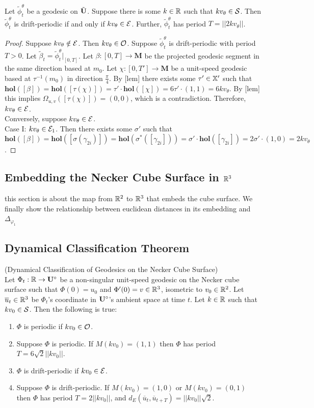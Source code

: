 \documentclass[]{article}
\def\hol{\mathbf{hol}}
\def\bM{\mathbf{M}}
\def\tildphi{\tilde{\phi}}
\begin{document}
\begin{thm}
Let $\tildphi_t^\theta$ be a geodesic on $\tilde{\mathbf{U}}$. Suppose there is some $k\in\mathbb{R}$ such that $kv_\theta\in\mathcal{S}$. Then $\tildphi_t^\theta$ is drift-periodic if and only if $kv_\theta\in\mathcal{E}$. Further, $\tildphi_t^\theta$ has period $T=||2kv_\theta||$.
\begin{proof}
Suppose $kv_\theta\notin\mathcal{E}$. Then $kv_\theta\in\mathcal{O}$. Suppose $\tildphi_t^\theta$ is drift-periodic with period $T>0$. Let $\tilde{\beta}_t=\tildphi_t^\theta\vert_{[0,T]}$. Let $\beta:[0,T]\rightarrow\bM$ be the projected geodesic segment in the same direction based at $m_0$. Let $\chi:[0,T']\rightarrow\bM$ be a unit-speed geodesic based at $\tau^{-1}(m_0)$ in direction $\frac{\pi}{4}$. By [lem] there exists some $\tau'\in\mathbb{X}'$ such that $\hol([\beta])=\hol([\tau(\chi)])=\tau'\cdot\hol([\chi])=6\tau'\cdot(1,1)=6kv_\theta$. By [lem] this implies $\Omega_{u,v}([\tau(\chi)])=(0,0)$, which is a contradiction. Therefore, $kv_\theta\in\mathcal{E}$.\\
Conversely, suppose $kv_\theta\in\mathcal{E}$.\\
Case I: $kv_\theta\in\mathcal{E}_1$. Then there exists some $\sigma'$ such that $\hol([\beta])=\hol([\sigma(\gamma_{2i})])=\hol(\sigma^*([\gamma_{2i}]))=\sigma'\cdot\hol([\gamma_{2i}])=2\sigma'\cdot(1,0)=2kv_\theta$.
\end{proof}
\end{thm}

\subsection{Embedding the Necker Cube Surface in $\mathbb{R}^3$}
this section is about the map from $\mathbb{R}^2$ to $\mathbb{R}^3$ that embeds the cube surface. We finally show the relationship between euclidean distances in its embedding and $\Delta_{\varphi_1}$

\subsection{Dynamical Classification Theorem}
\begin{thm*}
(Dynamical Classification of Geodesics on the Necker Cube Surface) \\Let $\Phi_t:\mathbb{R}\rightarrow\mathbf{U}^\circ$ be a non-singular unit-speed geodesic on the Necker cube surface such that $\Phi(0)=u_0$ and $\Phi'(0)=v\in\mathbb{R}^3$, isometric to $v_0\in\mathbb{R}^2$. Let $\overline{u}_t\in\mathbb{R}^3$ be $\Phi_t$'s coordinate in $\mathbf{U}^\circ$'s ambient space at time $t$. Let $k\in\mathbb{R}$ such that $kv_0\in\mathcal{S}$. Then the following is true:
\begin{enumerate}[label=(\roman*)]
\item $\Phi$ is periodic if $kv_0\in\mathcal{O}$.
\item Suppose $\Phi$ is periodic. If $M (kv_0)=(1,1)$ then $\Phi$ has period $T=6\sqrt{2}||kv_0||$.
\item $\Phi$ is drift-periodic if $kv_0\in\mathcal{E}$. 
\item Suppose $\Phi$ is drift-periodic. If $M (kv_0)=(1,0)$ or $M (kv_0)=(0,1)$ then $\Phi$ has period $T=2||kv_0||$, and $d_E(\overline{u}_t,\overline{u}_{t+T})=||kv_0||\sqrt{2}$.
\end{enumerate}
\end{thm*}
\end{document}

